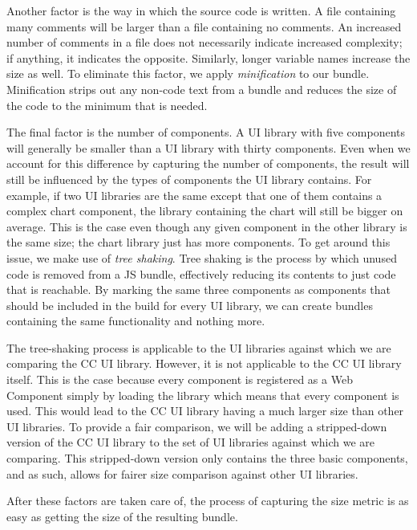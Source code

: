 Another factor is the way in which the source code is written. A file containing many comments will be larger than a file containing no comments. An increased number of comments in a file does not necessarily indicate increased complexity; if anything, it indicates the opposite. Similarly, longer variable names increase the size as well. To eliminate this factor, we apply \emph{minification} to our bundle. Minification strips out any non-code text from a bundle and reduces the size of the code to the minimum that is needed.

The final factor is the number of components. A UI library with five components will generally be smaller than a UI library with thirty components. Even when we account for this difference by capturing the number of components, the result will still be influenced by the types of components the UI library contains. For example, if two UI libraries are the same except that one of them contains a complex chart component, the library containing the chart will still be bigger on average. This is the case even though any given component in the other library is the same size; the chart library just has more components. To get around this issue, we make use of \emph{tree shaking}. Tree shaking is the process by which unused code is removed from a JS bundle, effectively reducing its contents to just code that is reachable. By marking the same three components as components that should be included in the build for every UI library, we can create bundles containing the same functionality and nothing more.

The tree-shaking process is applicable to the UI libraries against which we are comparing the CC UI library. However, it is not applicable to the CC UI library itself. This is the case because every component is registered as a Web Component simply by loading the library which means that every component is used. This would lead to the CC UI library having a much larger size than other UI libraries. To provide a fair comparison, we will be adding a stripped-down version of the CC UI library to the set of UI libraries against which we are comparing. This stripped-down version only contains the three basic components, and as such, allows for fairer size comparison against other UI libraries.

After these factors are taken care of, the process of capturing the size metric is as easy as getting the size of the resulting bundle.

